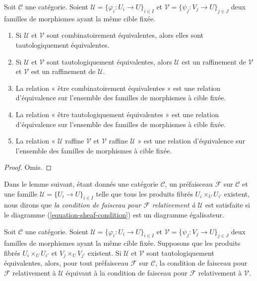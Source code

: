 \begin{lemma}
\label{lemma-tautological-combinatorial}
Soit $\mathcal{C}$ une catégorie. Soient
$\mathcal{U} = \{\varphi_i : U_i \to U\}_{i\in I}$ et
$\mathcal{V} = \{\psi_j : V_j \to U\}_{j\in J}$ deux familles de morphismes
ayant la même cible fixée.
\begin{enumerate}
\item Si $\mathcal{U}$ et $\mathcal{V}$ sont combinatoirement équivalentes,
alors elles sont tautologiquement équivalentes.
\item Si $\mathcal{U}$ et $\mathcal{V}$ sont tautologiquement équivalentes,
alors $\mathcal{U}$ est un raffinement de $\mathcal{V}$ et $\mathcal{V}$ est
un raffinement de $\mathcal{U}$.
\item La relation « être combinatoirement équivalentes » est une relation
d’équivalence sur l’ensemble des familles de morphismes à cible fixée.
\item La relation « être tautologiquement équivalentes » est une relation
d’équivalence sur l’ensemble des familles de morphismes à cible fixée.
\item La relation « $\mathcal{U}$ raffine $\mathcal{V}$ et $\mathcal{V}$
raffine $\mathcal{U}$ » est une relation d’équivalence sur l’ensemble des
familles de morphismes à cible fixée.
\end{enumerate}
\end{lemma}

\begin{proof}
Omis.
\end{proof}

\noindent
Dans le lemme suivant, étant donnés une catégorie $\mathcal{C}$, un
préfaisceau $\mathcal{F}$ sur $\mathcal{C}$ et une famille
$\mathcal{U} = \{U_i \to U\}_{i\in I}$ telle que tous les produits fibrés
$U_i \times_U U_{i'}$ existent, nous dirons que {\it la condition de faisceau
pour $\mathcal{F}$ relativement à $\mathcal{U}$} est satisfaite si le
diagramme (\ref{equation-sheaf-condition}) est un diagramme égalisateur.

\begin{lemma}
\label{lemma-tautological-same-sheaf}
Soit $\mathcal{C}$ une catégorie. Soient
$\mathcal{U} = \{\varphi_i : U_i \to U\}_{i\in I}$ et
$\mathcal{V} = \{\psi_j : V_j \to U\}_{j\in J}$ deux familles de morphismes
ayant la même cible fixée. Supposons que les produits fibrés
$U_i \times_U U_{i'}$ et $V_j \times_U V_{j'}$ existent. Si $\mathcal{U}$ et
$\mathcal{V}$ sont tautologiquement équivalentes, alors, pour tout
préfaisceau $\mathcal{F}$ sur $\mathcal{C}$, la condition de faisceau pour
$\mathcal{F}$ relativement à $\mathcal{U}$ équivaut à la condition de
faisceau pour $\mathcal{F}$ relativement à $\mathcal{V}$.
\end{lemma}

